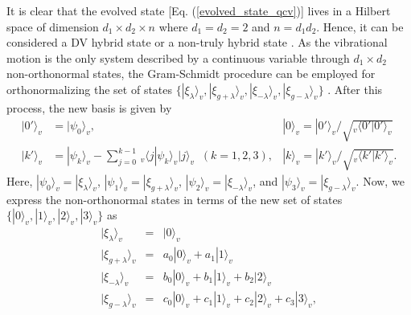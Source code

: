 It is clear that the evolved state [Eq. (\ref{evolved_state_qcv})] lives in a Hilbert space of dimension $d_{1}\times d_{2}\times n$ where $d_{1}=d_{2}=2$ and $n=d_{1}d_{2}$. Hence, it can be considered a DV hybrid state or a non-truly hybrid state \cite{kreis2012classifying}. As the vibrational motion is the only system described by a continuous variable through $d_{1}\times d_{2}$ non-orthonormal states, the Gram-Schmidt procedure can be employed for orthonormalizing the set of states $\{|\xi_{\lambda}\rangle_{v}, |\xi_{g+\lambda}\rangle_{v}, |\xi_{-\lambda}\rangle_{v}, |\xi_{g-\lambda}\rangle_{v}\}$ \cite{nielsen2000chuang}. After this process, the new basis is given by
\begin{align}
|0'\rangle_{v} &= |\psi_{0}\rangle_{v}, 
 & |0\rangle_{v}=|0'\rangle_{v}/\sqrt{_{v}
 \langle 0'|0'\rangle_{v}}\nonumber\\
|k'\rangle_{v} &= |\psi_{k}\rangle_{v}-
\sum_{j=0}^{k-1}\!\, _{v}\langle j|
\psi_{k}\rangle_{v} 
|j\rangle_{v} \;\; (k=1,2,3), & 
|k\rangle_{v}=|k'\rangle_{v}/\sqrt{_{v}
\langle k'|k'\rangle_{v}}.
\end{align}
Here, $|\psi_{0}\rangle_{v}=|\xi_{\lambda}\rangle_{v}$, $|\psi_{1}\rangle_{v}=|\xi_{g+\lambda}\rangle_{v}$, $|\psi_{2}\rangle_{v}=|\xi_{-\lambda}\rangle_{v}$, and $|\psi_{3}\rangle_{v}=|\xi_{g-\lambda}\rangle_{v}$.
Now, we express the non-orthonormal states in terms of the new set of states $\{|0\rangle_{v}, |1\rangle_{v}, |2\rangle_{v}, |3\rangle_{v}\}$ as
\begin{eqnarray}\label{orthonormal_vibrational_basis}
|\xi_{\lambda}\rangle_{v}&=&|0\rangle_{v}\nonumber\\
|\xi_{g+\lambda}\rangle_{v}&=&a_{0}|0\rangle_{v}+a_{1}|1\rangle_{v}\nonumber\\
|\xi_{-\lambda}\rangle_{v}&=&b_{0}|0\rangle_{v}+b_{1}|1\rangle_{v}+b_{2}|2\rangle_{v}\nonumber\\
|\xi_{g-\lambda}\rangle_{v}&=&c_{0}|0\rangle_{v}+c_{1}|1\rangle_{v}+c_{2}|2\rangle_{v}+c_{3}|3\rangle_{v},
\end{eqnarray}
